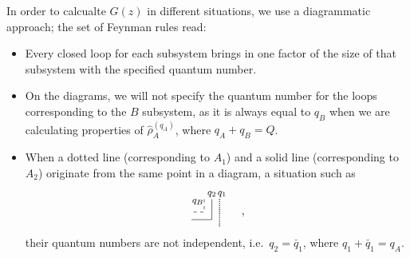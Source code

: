 \documentclass[aps,pra,reprint,superscriptaddress,twocolumn,notitlepage]{revtex4-1}
\numberwithin{equation}{section}
\begin{document}
In order to calcualte $G(z)$ in different situations, we use a diagrammatic approach; the set of Feynman rules read:
\begin{itemize}
    \item Every closed loop for each subsystem brings in one factor of the size of that subsystem with the specified quantum number.
    \item On the diagrams, we will not specify the quantum number for the loops corresponding to the $B$ subsystem, as it is always equal to $q_B$ when we are calculating properties of $\hat \rho_{A}^{(q_A)}$, where $q_A + q_B = Q$.
    \item When a dotted line (corresponding to $A_1$) and a solid line (corresponding to $A_2$) originate from the same point in a diagram, a situation such as
    \begin{equation*}
        \tikz[scale=0.8,baseline=-0.5ex]{
        \draw[dashed] (0,0.5) -- (0,0) -- (-0.5,0);
        \draw (0.3,0.5)-- (0.3,-0.3) -- (-0.5,-0.3);
        \draw[densely dotted,thick] (0.6,0.5)-- (0.6,-0.6);
        \draw (0.7,0.7) circle (0.) node[anchor=center] {\footnotesize$q_1$};
        \draw (0.3,0.7) circle (0.) node[anchor=center] {\footnotesize$q_2$};
        \draw (-0.25,0.4) circle (0.) node[anchor=center] {\footnotesize$q_B$};
        } \quad ,
    \end{equation*}
    their quantum numbers are not independent, i.e.~$q_2=\bar{q}_1$, where $q_1 + \bar{q}_1 = q_A$.
\end{itemize}
\end{document}
